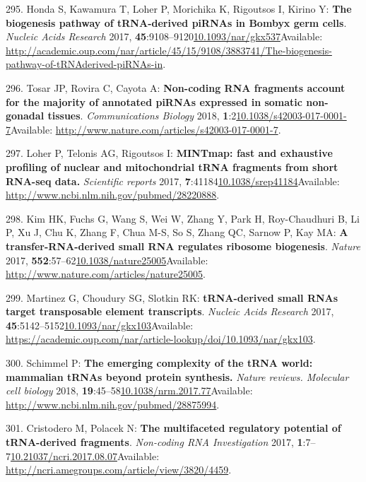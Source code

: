 \documentclass[
]{book}
\begin{document}
\leavevmode\hypertarget{ref-Honda2017}{}%
295. Honda S, Kawamura T, Loher P, Morichika K, Rigoutsos I, Kirino Y: \textbf{The biogenesis pathway of tRNA-derived piRNAs in Bombyx germ cells}. \emph{Nucleic Acids Research} 2017, \textbf{45}:9108--9120\href{https://doi.org/10.1093/nar/gkx537}{10.1093/nar/gkx537}Available: \url{http://academic.oup.com/nar/article/45/15/9108/3883741/The-biogenesis-pathway-of-tRNAderived-piRNAs-in}.

\leavevmode\hypertarget{ref-Tosar2018}{}%
296. Tosar JP, Rovira C, Cayota A: \textbf{Non-coding RNA fragments account for the majority of annotated piRNAs expressed in somatic non-gonadal tissues}. \emph{Communications Biology} 2018, \textbf{1}:2\href{https://doi.org/10.1038/s42003-017-0001-7}{10.1038/s42003-017-0001-7}Available: \url{http://www.nature.com/articles/s42003-017-0001-7}.

\leavevmode\hypertarget{ref-Loher2017}{}%
297. Loher P, Telonis AG, Rigoutsos I: \textbf{MINTmap: fast and exhaustive profiling of nuclear and mitochondrial tRNA fragments from short RNA-seq data.} \emph{Scientific reports} 2017, \textbf{7}:41184\href{https://doi.org/10.1038/srep41184}{10.1038/srep41184}Available: \url{http://www.ncbi.nlm.nih.gov/pubmed/28220888}.

\leavevmode\hypertarget{ref-Kim2017}{}%
298. Kim HK, Fuchs G, Wang S, Wei W, Zhang Y, Park H, Roy-Chaudhuri B, Li P, Xu J, Chu K, Zhang F, Chua M-S, So S, Zhang QC, Sarnow P, Kay MA: \textbf{A transfer-RNA-derived small RNA regulates ribosome biogenesis}. \emph{Nature} 2017, \textbf{552}:57--62\href{https://doi.org/10.1038/nature25005}{10.1038/nature25005}Available: \url{http://www.nature.com/articles/nature25005}.

\leavevmode\hypertarget{ref-Martinez2017}{}%
299. Martinez G, Choudury SG, Slotkin RK: \textbf{tRNA-derived small RNAs target transposable element transcripts}. \emph{Nucleic Acids Research} 2017, \textbf{45}:5142--5152\href{https://doi.org/10.1093/nar/gkx103}{10.1093/nar/gkx103}Available: \url{https://academic.oup.com/nar/article-lookup/doi/10.1093/nar/gkx103}.

\leavevmode\hypertarget{ref-Schimmel2017}{}%
300. Schimmel P: \textbf{The emerging complexity of the tRNA world: mammalian tRNAs beyond protein synthesis.} \emph{Nature reviews. Molecular cell biology} 2018, \textbf{19}:45--58\href{https://doi.org/10.1038/nrm.2017.77}{10.1038/nrm.2017.77}Available: \url{http://www.ncbi.nlm.nih.gov/pubmed/28875994}.

\leavevmode\hypertarget{ref-Cristodero2017}{}%
301. Cristodero M, Polacek N: \textbf{The multifaceted regulatory potential of tRNA-derived fragments}. \emph{Non-coding RNA Investigation} 2017, \textbf{1}:7--7\href{https://doi.org/10.21037/ncri.2017.08.07}{10.21037/ncri.2017.08.07}Available: \url{http://ncri.amegroups.com/article/view/3820/4459}.
\end{document}
